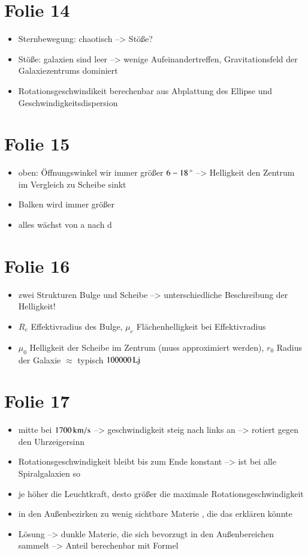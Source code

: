 \section{Folie 14}

\begin{itemize}
\item Sternbewegung: chaotisch --> Stöße?
\item Stöße: galaxien sind leer --> wenige Aufeinandertreffen, Gravitationsfeld der Galaxiezentrums dominiert
\item Rotationsgeschwindikeit berechenbar aus Abplattung des Ellipse und Geschwindigkeitsdispersion
\end{itemize}



\section{Folie 15}

\begin{itemize}
\item oben: Öffnungswinkel wir immer größer $\unit[6-18]{^\circ}$ --> Helligkeit den Zentrum im Vergleich zu Scheibe sinkt
\item Balken wird immer größer 
\item alles wächst von a nach d
\end{itemize}



\section{Folie 16}

\begin{itemize}
\item zwei Strukturen Bulge und Scheibe --> unterschiedliche Beschreibung der Helligkeit!
\item $R_e$ Effektivradius des Bulge, $\mu_e$ Flächenhelligkeit bei Effektivradius
\item $\mu_0$ Helligkeit der Scheibe im Zentrum (muss approximiert werden), $r_0$ Radius der Galaxie $\approx$ typisch $\unit[100000]{Lj}$
\end{itemize}


\section{Folie 17}

\begin{itemize}
\item mitte bei $\unit[1700]{km/s}$ --> geschwindigkeit steig nach links an --> rotiert gegen den Uhrzeigersinn
\item Rotationsgeschwindigkeit bleibt bis zum Ende konstant --> ist bei alle Spiralgalaxien so
\item je höher die Leuchtkraft, desto größer die maximale Rotationsgeschwindigkeit
\item in den Außenbezirken zu wenig sichtbare Materie , die das erklären könnte
\item Lösung --> dunkle Materie, die sich bevorzugt in den Außenbereichen sammelt --> Anteil berechenbar mit Formel
\end{itemize}


